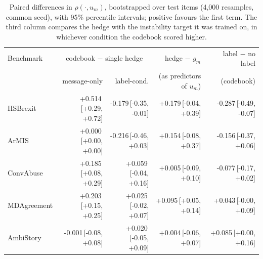 \begin{table}[t]
\centering
\small
\begin{tabular}{lrrrr}
\hline
Benchmark & \multicolumn{2}{c}{codebook $-$ single hedge} & hedge $-$ $g_m$ & label $-$ no label \\
 & message-only & label-cond. & (as predictors of $u_m$) & (codebook) \\
\hline
HSBrexit & +0.514{\scriptsize\,[+0.29, +0.72]} & -0.179{\scriptsize\,[-0.35, -0.01]} & +0.179{\scriptsize\,[-0.04, +0.39]} & -0.287{\scriptsize\,[-0.49, -0.07]} \\
ArMIS & +0.000{\scriptsize\,[+0.00, +0.00]} & -0.216{\scriptsize\,[-0.46, +0.03]} & +0.154{\scriptsize\,[-0.08, +0.37]} & -0.156{\scriptsize\,[-0.37, +0.06]} \\
ConvAbuse & +0.185{\scriptsize\,[+0.08, +0.29]} & +0.059{\scriptsize\,[-0.04, +0.16]} & +0.005{\scriptsize\,[-0.09, +0.10]} & -0.077{\scriptsize\,[-0.17, +0.02]} \\
MDAgreement & +0.203{\scriptsize\,[+0.15, +0.25]} & +0.025{\scriptsize\,[-0.02, +0.07]} & +0.095{\scriptsize\,[+0.05, +0.14]} & +0.043{\scriptsize\,[-0.00, +0.09]} \\
AmbiStory & -0.001{\scriptsize\,[-0.08, +0.08]} & +0.020{\scriptsize\,[-0.05, +0.09]} & +0.004{\scriptsize\,[-0.06, +0.07]} & +0.085{\scriptsize\,[+0.00, +0.16]} \\
\hline
\end{tabular}
\caption{Paired differences in $\rho(\cdot,u_m)$, bootstrapped over test items (4,000 resamples, common seed), with 95\% percentile intervals; positive favours the first term. The third column compares the hedge with the instability target it was trained on, in whichever condition the codebook scored higher.}
\label{tab:paired}
\end{table}